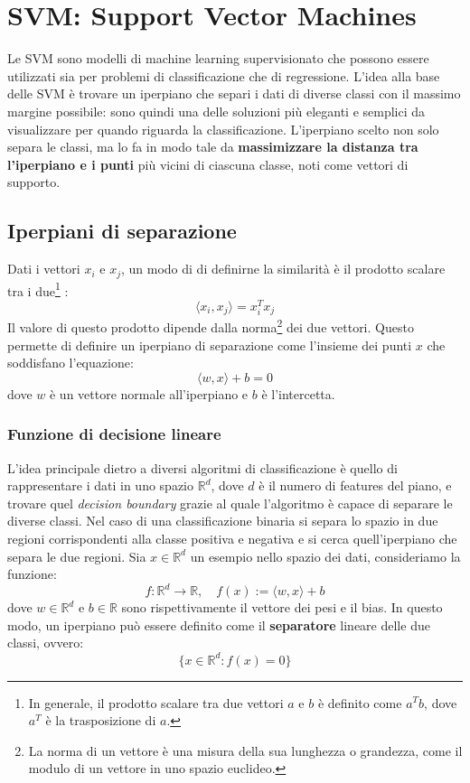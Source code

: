 \chapter{SVM: Support Vector Machines}
Le SVM sono modelli di machine learning supervisionato che possono essere utilizzati sia per problemi di classificazione che di regressione.  L'idea alla base delle SVM è trovare un iperpiano che separi i dati di diverse classi con il massimo margine possibile: sono quindi una delle soluzioni più eleganti e semplici da visualizzare per quando riguarda la classificazione. L'iperpiano scelto non solo separa le classi, ma lo fa in modo tale da \textbf{massimizzare la distanza tra l'iperpiano e i punti} più vicini di ciascuna classe, noti come vettori di supporto. 

\section{Iperpiani di separazione}
Dati i vettori $x_i$ e $x_j$, un modo di di definirne la similarità è il prodotto scalare tra i due\footnote{In generale, il prodotto scalare tra due vettori $a$ e $b$ è definito come $a^T b$, dove $a^T$ è la trasposizione di $a$.} :
\[
\langle x_i, x_j \rangle = x_i^T x_j
\]
Il valore di questo prodotto dipende dalla norma\footnote{La norma di un vettore è una misura della sua lunghezza o grandezza, come il modulo di un vettore in uno spazio euclideo.} dei due vettori. Questo permette di definire un iperpiano di separazione come l'insieme dei punti $x$ che soddisfano l'equazione:
\[
\langle w, x \rangle + b = 0
\]
dove $w$ è un vettore normale all'iperpiano e $b$ è l'intercetta.

\subsection{Funzione di decisione lineare}
L'idea principale dietro a diversi algoritmi di classificazione è quello di rappresentare i dati in uno spazio $\mathbb{R}^d$, dove $d$ è il numero di features del piano, e trovare quel \emph{decision boundary} grazie al quale l'algoritmo è capace di separare le diverse classi. Nel caso di una classificazione binaria si separa lo spazio in due regioni corrispondenti alla classe positiva e negativa e si cerca quell'iperpiano che separa le due regioni. Sia $x \in \mathbb{R}^d$ un esempio nello spazio dei dati, consideriamo la funzione:
\[
f: \mathbb{R}^d \rightarrow \mathbb{R}, \quad f(x) := \langle w, x \rangle + b
\]
dove $w \in \mathbb{R}^d$ e $b \in \mathbb{R}$ sono rispettivamente il vettore dei pesi e il bias. In questo modo, un iperpiano può essere definito come il \textbf{separatore} lineare delle due classi, ovvero:
\begin{equation}
	\{ x \in \mathbb{R}^d : f(x) = 0 \}
	\label{eq:svm_hyperplane}
\end{equation}


